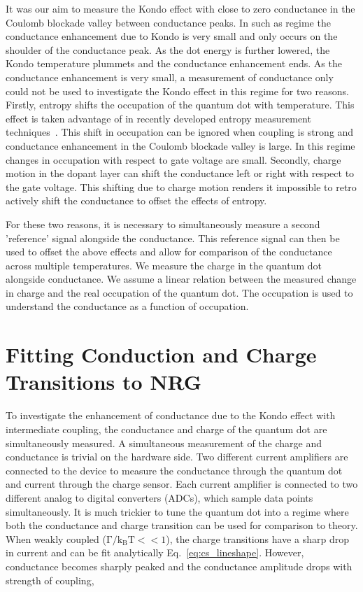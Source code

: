 It was our aim to measure the Kondo effect with close to zero conductance in the Coulomb blockade valley between conductance peaks. In such as regime the conductance enhancement due to Kondo is very small and only occurs on the shoulder of the conductance peak. As the dot energy is further lowered, the Kondo temperature plummets and the conductance enhancement ends. As the conductance enhancement is very small, a measurement of conductance only could not be used to investigate the Kondo effect in this regime for two reasons. Firstly, entropy shifts the occupation of the quantum dot with temperature. This effect is taken advantage of in recently developed entropy measurement techniques~\cite{hartman, child_strong, child_meas}. This shift in occupation can be ignored when coupling is strong and conductance enhancement in the Coulomb blockade valley is large. In this regime changes in occupation with respect to gate voltage are small. Secondly, charge motion in the dopant layer can shift the conductance left or right with respect to the gate voltage. This shifting due to charge motion renders it impossible to retro actively shift the conductance to offset the effects of entropy. 

For these two reasons, it is necessary to simultaneously measure a second 'reference' signal alongside the conductance. This reference signal can then be used to offset the above effects and allow for comparison of the conductance across multiple temperatures. We measure the charge in the quantum dot alongside conductance. We assume a linear relation between the measured change in charge and the real occupation of the quantum dot. The occupation is used to understand the conductance as a function of occupation. 



\section{Fitting Conduction and Charge Transitions to NRG}
To investigate the enhancement of conductance due to the Kondo effect with intermediate coupling, the conductance and charge of the quantum dot are simultaneously measured. A simultaneous measurement of the charge and conductance is trivial on the hardware side. Two different current amplifiers are connected to the device to measure the conductance through the quantum dot and current through the charge sensor. Each current amplifier is connected to two different analog to digital converters (ADCs), which sample data points simultaneously. It is much trickier to tune the quantum dot into a regime where both the conductance and charge transition can be used for comparison to theory. When weakly coupled ($\mathrm{\Gamma/k_BT}<<1$), the charge transitions have a sharp drop in current and can be fit analytically Eq.~\ref{eq:cs_lineshape}. However, conductance becomes sharply peaked and the conductance amplitude drops with strength of coupling, 

